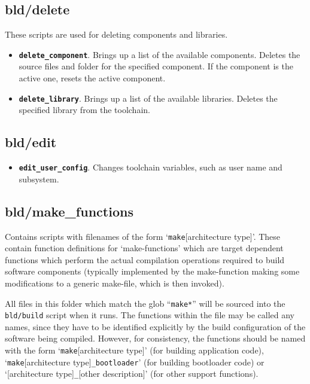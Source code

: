 \documentclass[a4paper, oneside, 11pt, titlepage, onecolumn, openright]{report}
\begin{document}
\subsection{bld/delete}
			\label{ss:bld/delete}
			These scripts are used for deleting components and libraries.
\begin{itemize}

\item \textbf{\texttt{delete\_component}}. Brings up a list of the available components. Deletes the source files and folder for the specified component. If the component is the active one, resets the active component.

\item \textbf{\texttt{delete\_library}}. Brings up a list of the available libraries. Deletes the specified library from the toolchain.

\end{itemize}

\subsection{bld/edit}
			\label{ss:bld/edit}
\begin{itemize}

\item \textbf{\texttt{edit\_user\_config}}. Changes toolchain variables, such as user name and subsystem.

\end{itemize}

\subsection{bld/make\_functions}
	\label{ss:bld/make_functions}
	
	Contains scripts with filenames of the form `\texttt{make}[architecture type]\texttt{}'.  These contain function definitions for `make-functions' which are target dependent functions which perform the actual compilation operations required to build software components (typically implemented by the make-function making some modifications to a generic make-file, which is then invoked).
	
All files in this folder which match the glob ``\texttt{make*}'' will be sourced into the \texttt{bld/build} script when it runs.  The functions within the file may be called any names, since they have to be identified explicitly by the build configuration of the software being compiled.  However, for consistency, the functions should be named with the form `\texttt{make}[architecture type]\texttt{}' (for building application code), `\texttt{make}[architecture type]\texttt{\_bootloader}' (for building bootloader code) or `[architecture type]\texttt{\_}[other description]' (for other support functions).
\end{document}
